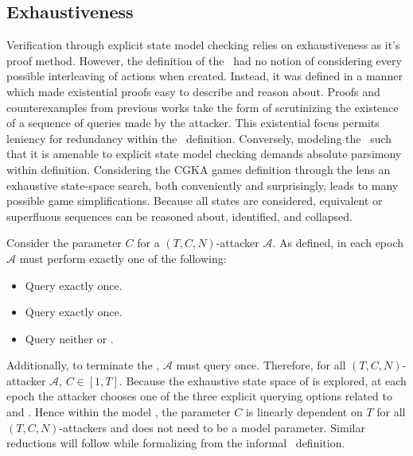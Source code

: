 \hypertarget{sec:exhaustiveness}{%
\subsection{Exhaustiveness}\label{sec:exhaustiveness}}

Verification through explicit state model checking relies on exhaustiveness as it's proof method.
However, the definition of the \CGKAsec\ had no notion of considering every possible interleaving of actions when created.
Instead, it was defined in a manner which made existential proofs easy to describe and reason about.
Proofs and counterexamples from previous works \autocite{alwen2019double, alwen2020security} take the form of scrutinizing the existence of a sequence of queries made by the attacker.
This existential focus permits leniency for redundancy within the \CGKAsec\ definition.
Conversely, modeling the \CGKAsec\ such that it is amenable to explicit state model checking demands absolute parsimony within definition.
Considering the CGKA games definition through the lens an exhaustive state-space search, both conveniently and surprisingly, leads to many possible game simplifications.
Because all states are considered, equivalent or superfluous sequences can be reasoned about, identified, and collapsed.

Consider the parameter \(C\) for a \((T, C, N)\)-attacker \(\mathcal{A}\).
As defined, in each epoch \(\mathcal{A}\) must perform exactly one of the following:

\begin{itemize}
  \item Query  exactly once.
  \item Query   exactly once.
  \item Query neither  or .
\end{itemize}

Additionally, to terminate the \CGKAsec, \(\mathcal{A}\) must query  once.
Therefore, for all \((T, C, N)\)-attacker \(\mathcal{A}\), \(C \in [1, T]\).
Because the exhaustive state space of is explored, at each epoch the attacker chooses one of the three explicit querying options related to  and .
Hence within the model , the parameter \(C\) is linearly dependent on \(T\) for all \((T, C, N)\)-attackers and does not need to be a model parameter.
Similar reductions will follow while formalizing  from the informal \CGKAsec\ definition.


